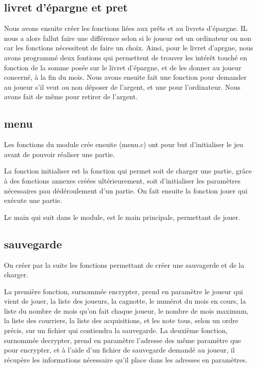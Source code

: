\documentclass[a4paper, 11pt]{report}
\begin{document}
\subsection{livret d'épargne et pret}
Nous avons ensuite créer les fonctions liées aux prêts et au livrets d'épargne.
IL nous a alors fallut faire une différence selon si le joueur est un ordinateur ou non car les fonctions nécessitent de faire un choix. Ainsi, pour le livret d'aprgne, nous avons programmé deux fontions qui permettent de trouver les intérêt touché en fonction de la somme posée sur le livret d'épargne, et de les donner au joueur concerné, à la fin du mois. Nous avons ensuite fait une fonction pour demander au joueur s'il veut ou non déposer de l'argent, et une pour l'ordinateur. Nous avons fait de même pour retirer de l'argent.


\subsection{menu}
Les fonctions du module crée ensuite (menu.c) ont pour but d'initialiser le jeu avant de pouvoir réaliser une partie.

La fonction initialiser est la fonction qui permet soit de charger une partie, grâce à des fonctions annexes créées ultérieurement, soit d'initialiser les paramètres nécessaires pau dédéroulement d'un partie.
On fait ensuite la fonction jouer qui exécute une partie.

Le main qui suit dans le module, est le main principale, permettant de jouer.

\subsection{sauvegarde}
On créer par la suite les fonctions permettant de créer une sauvagerde et de la charger.

La première fonction, surnommée encrypter, prend en paramètre le joueur qui vient de jouer, la liste des joueurs, la cagnotte, le numérot du mois en cours, la liste du nombre de mois qu'on fait chaque joueur, le nombre de mois maximum, la liste des courriers, la liste des acquisitions, et les note tous, selon un ordre précis, sur un fichier qui contiendra la sauvegarde.
La deuxième fonction, surnommée decrypter, prend en paramètre l'adresse des même paramètre que pour encrypter, et à l'aide d'un fichier de sauvegarde demandé au joueur, il récupère les informations nécessaire qu'il place dans les adresses en paramètres.
\end{document}
